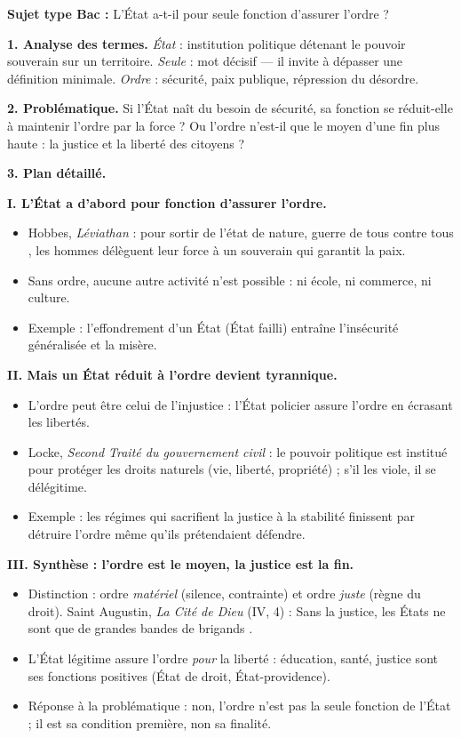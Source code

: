\documentclass[11pt]{article}
\begin{document}
\begin{exoresolu}
\textbf{Sujet type Bac :} L'État a-t-il pour seule fonction d'assurer l'ordre ?

\tcblower
\textbf{1. Analyse des termes.} \emph{État} : institution politique détenant le pouvoir souverain sur un territoire. \emph{Seule} : mot décisif — il invite à dépasser une définition minimale. \emph{Ordre} : sécurité, paix publique, répression du désordre.

\textbf{2. Problématique.} \guillemotleft Si l'État naît du besoin de sécurité, sa fonction se réduit-elle à maintenir l'ordre par la force ? Ou l'ordre n'est-il que le moyen d'une fin plus haute : la justice et la liberté des citoyens ? \guillemotright

\textbf{3. Plan détaillé.}

\textbf{I. L'État a d'abord pour fonction d'assurer l'ordre.}
\begin{itemize}
\item Hobbes, \emph{Léviathan} : pour sortir de l'état de nature, \guillemotleft guerre de tous contre tous \guillemotright, les hommes délèguent leur force à un souverain qui garantit la paix.
\item Sans ordre, aucune autre activité n'est possible : ni école, ni commerce, ni culture.
\item Exemple : l'effondrement d'un État (État failli) entraîne l'insécurité généralisée et la misère.
\end{itemize}

\textbf{II. Mais un État réduit à l'ordre devient tyrannique.}
\begin{itemize}
\item L'ordre peut être celui de l'injustice : l'État policier assure l'ordre en écrasant les libertés.
\item Locke, \emph{Second Traité du gouvernement civil} : le pouvoir politique est institué pour protéger les droits naturels (vie, liberté, propriété) ; s'il les viole, il se délégitime.
\item Exemple : les régimes qui sacrifient la justice à la stabilité finissent par détruire l'ordre même qu'ils prétendaient défendre.
\end{itemize}

\textbf{III. Synthèse : l'ordre est le moyen, la justice est la fin.}
\begin{itemize}
\item Distinction : ordre \emph{matériel} (silence, contrainte) et ordre \emph{juste} (règne du droit). Saint Augustin, \emph{La Cité de Dieu} (IV, 4) : \guillemotleft Sans la justice, les États ne sont que de grandes bandes de brigands \guillemotright.
\item L'État légitime assure l'ordre \emph{pour} la liberté : éducation, santé, justice sont ses fonctions positives (État de droit, État-providence).
\item Réponse à la problématique : non, l'ordre n'est pas la seule fonction de l'État ; il est sa condition première, non sa finalité.
\end{itemize}


\end{exoresolu}
\end{document}
